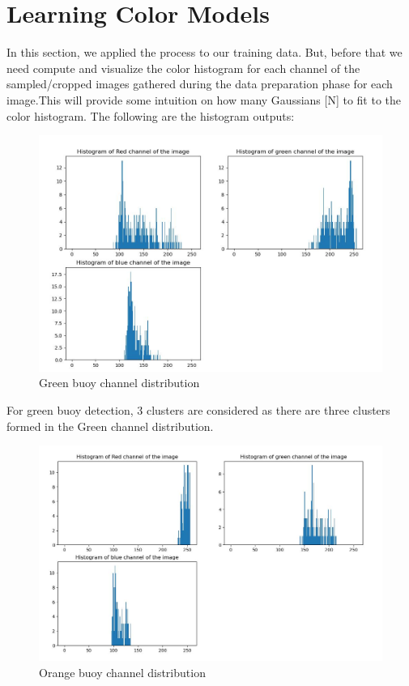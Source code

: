 \documentclass[12pt]{article}
\begin{document}
\section{Learning Color Models}
In this section, we applied the process to our training data. But, before that we need compute and visualize the color histogram for each channel of the sampled/cropped images gathered during the data preparation phase for each image.This will provide some intuition on how many Gaussians [N] to ﬁt to the color histogram. The following are the histogram outputs:
\newpage
\begin{figure}[h]
    \centering
    \includegraphics[width=13cm]{greenbuoyhistogram}
    \caption{Green buoy channel distribution}
    \label{fig:Green buoy channel distribution}
\end{figure}
For green buoy detection, 3 clusters are considered as there are three clusters formed in the Green channel distribution.
\newline
\begin{figure}[h]
    \centering
    \includegraphics[width=13cm]{orangebuoyhistogram}
    \caption{Orange buoy channel distribution}
    \label{fig:Orange buoy channel distribution}
\end{figure}
\end{document}
